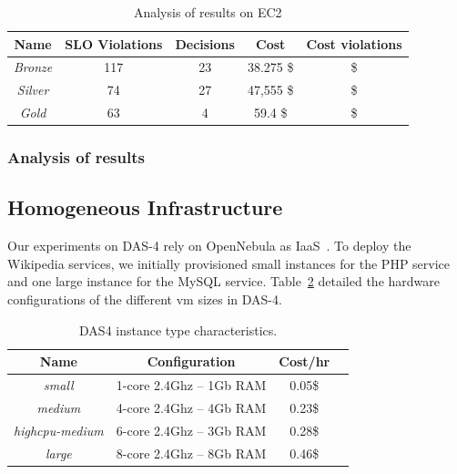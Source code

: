 \begin{table}\label{summaryEC2}
  {\scriptsize 
\begin{center}
    \begin{tabular}{  | c | c | c | c | c |}
    \hline
         \textbf{Name}  & \textbf{SLO Violations} & \textbf{Decisions}  & \textbf{Cost}  & \textbf{Cost violations} \\ \hline
   \textit{Bronze}   &  117 &  23 &  38.275 \$ &  \$ \\ \hline   
   \textit{Silver}  &  74 &  27 &  47,555 \$ &   \$ \\ \hline   
\textit{Gold} &   63  &  4 &  59.4 \$ &  \$ \\ \hline   

 \end{tabular}
\end{center}
\vspace{-5mm}
\caption{Analysis of results on EC2}
\label{summaryEC2}
}
\end{table}


\subsubsection{Analysis of results}



\subsection{Homogeneous Infrastructure}

Our experiments on DAS-4 rely on OpenNebula as IaaS~\cite{sotomayor_virtual_2009}. To deploy the Wikipedia services, we initially provisioned small instances for the PHP service and one large instance for the MySQL service. Table~\ref{DAS4instances} detailed the hardware configurations of the different vm sizes in DAS-4.

\begin{table}\label{DAS4instances}
  {\scriptsize 
\begin{center}
    \begin{tabular}{  | c | c | c | c | }
    \hline
       \textbf{Name}  & \textbf{Configuration} & \textbf{Cost/hr} \\ \hline
   \textit{small}   & 1-core 2.4Ghz -- 1Gb RAM&  0.05\$ \\ \hline
   \textit{medium}   & 4-core 2.4Ghz  -- 4Gb RAM&  0.23\$ \\ \hline
\textit{highcpu-medium} & 6-core 2.4Ghz -- 3Gb RAM& 0.28\$   \\ \hline
\textit{large} & 8-core 2.4Ghz  -- 8Gb RAM& 0.46\$   \\ \hline

 \end{tabular}
\end{center}
\vspace{-5mm}
\caption{DAS4 instance type characteristics.}
\label{DAS4instances}
}
\end{table}


